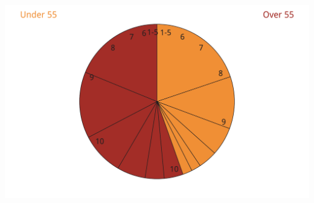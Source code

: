 \documentclass[tikz]{standalone}\usepackage[]{graphicx}\usepackage[]{color}
\newenvironment{knitrout}{}{} %
\begin{document}
\begin{knitrout}
\color{fgcolor}
\includegraphics[width=11.000in,height=7in]{./Super-tax-targeting/b5-super-atlas/Figure4-5-1} 

\end{knitrout}
\end{document}
